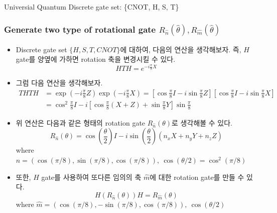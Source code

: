 \documentclass[9pt]{beamer}
\begin{document}
\begin{section}{Universial Quantum Discrete gate set: \{CNOT, H, S, T\}}
\begin{frame}
        \end{frame}

        \begin{frame}
            \frametitle{Generate two type of rotational gate $R_{{\hat n}}(\hat \theta), R_{\hat m}(\hat \theta)$}
            \begin{itemize}
                \item Discrete gate set $\{H, S, T, CNOT\}$에 대하여, 다음의 연산을 생각해보자. 즉, $H$ gate를 양옆에 가하면 rotation 축을 변경시킬 수 있다.
                $$HTH = e^{-i\frac{\pi}{8}X}$$
                \item 그럼 다음 연산을 생각해보자.
                $$
                \begin{aligned}
                THTH &= \exp \left(-i \frac{\pi}{8} Z\right) \exp \left(-i \frac{\pi}{8} X\right) = \left[\cos \frac{\pi}{8} I-i \sin \frac{\pi}{8} Z\right]\left[\cos \frac{\pi}{8} I-i \sin \frac{\pi}{8} X\right] \\
                & =\cos ^2 \frac{\pi}{8} I-i\left[\cos \frac{\pi}{8}(X+Z)+\sin \frac{\pi}{8} Y\right] \sin \frac{\pi}{8}
                \end{aligned}
                $$
                \item 위 연산은 다음과 같은 형태의 rotation gate $R_{\hat n}(\theta)$로 생각해볼 수 있다.
                $$
                R_{\hat{n}}(\theta) =\cos \left(\frac{\theta}{2}\right) I-i \sin \left(\frac{\theta}{2}\right)\left(n_x X+n_y Y+n_z Z\right)
                $$
                where $\hat n = (\cos(\pi/8), \sin(\pi/8), \cos(\pi/8)),\ \cos(\theta/2) = \cos^2(\pi/8) $
                \item 또한, $H$ gate를 사용하여 또다른 임의의 축 $\hat m$에 대한 rotation gate를 만들 수 있다.
                $$H(R_{\hat n} (\theta)) H = R_{\hat m} (\theta)$$
                where $\hat m = (\cos(\pi/8), -\sin(\pi/8), \cos(\pi/8)),\ \cos(\theta/2) $
            \end{itemize}
            
            
        
        \end{frame}


\end{section}
\end{document}
